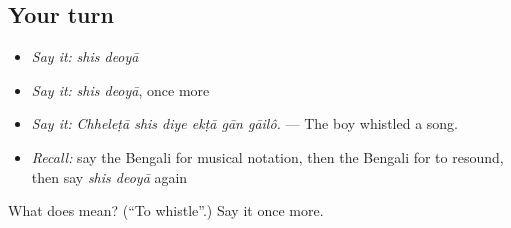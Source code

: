 \subsection*{Your turn}
\begin{itemize}
\raggedright
  \item \emph{Say it:} \emph{shis deoyā}
  \item \emph{Say it:} \emph{shis deoyā}, once more
  \item \emph{Say it:} \emph{Chheleṭā shis diye ekṭā gān gāilô.} — The boy whistled a song.
  \item \emph{Recall:} say the Bengali for musical notation, then the Bengali for to resound, then say \emph{shis deoyā} again
\end{itemize}

\begin{tcolorbox}[breakable,colback=teal!4,colframe=teal!35!black,title={Before you move on}]
What does   mean? (\textquotedblleft{}To whistle\textquotedblright{}.) Say it once more.
\end{tcolorbox}
